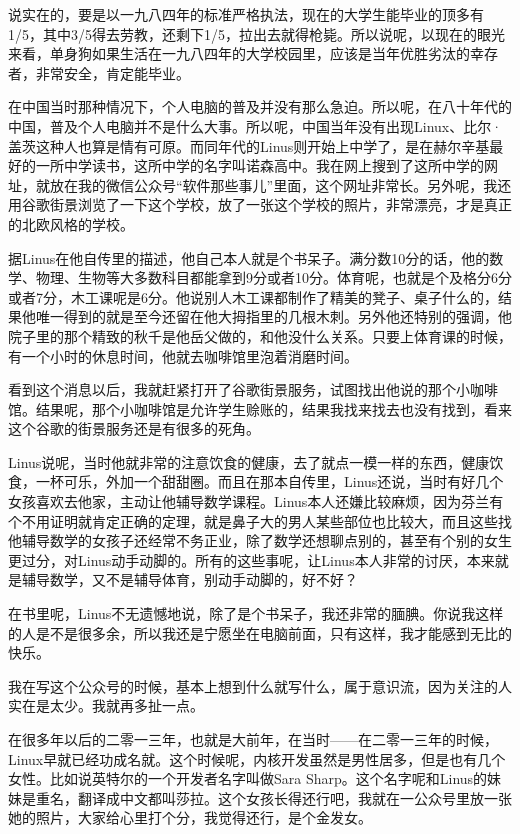 \documentclass[
  letterpaper,
  DIV=11,
  numbers=noendperiod]{scrreprt}
\begin{document}
说实在的，要是以一九八四年的标准严格执法，现在的大学生能毕业的顶多有1/5，其中3/5得去劳教，还剩下1/5，拉出去就得枪毙。所以说呢，以现在的眼光来看，单身狗如果生活在一九八四年的大学校园里，应该是当年优胜劣汰的幸存者，非常安全，肯定能毕业。

在中国当时那种情况下，个人电脑的普及并没有那么急迫。所以呢，在八十年代的中国，普及个人电脑并不是什么大事。所以呢，中国当年没有出现Linux、比尔·盖茨这种人也算是情有可原。而同年代的Linus则开始上中学了，是在赫尔辛基最好的一所中学读书，这所中学的名字叫诺森高中。我在网上搜到了这所中学的网址，就放在我的微信公众号``软件那些事儿''里面，这个网址非常长。另外呢，我还用谷歌街景浏览了一下这个学校，放了一张这个学校的照片，非常漂亮，才是真正的北欧风格的学校。

据Linus在他自传里的描述，他自己本人就是个书呆子。满分数10分的话，他的数学、物理、生物等大多数科目都能拿到9分或者10分。体育呢，也就是个及格分6分或者7分，木工课呢是6分。他说别人木工课都制作了精美的凳子、桌子什么的，结果他唯一得到的就是至今还留在他大拇指里的几根木刺。另外他还特别的强调，他院子里的那个精致的秋千是他岳父做的，和他没什么关系。只要上体育课的时候，有一个小时的休息时间，他就去咖啡馆里泡着消磨时间。

看到这个消息以后，我就赶紧打开了谷歌街景服务，试图找出他说的那个小咖啡馆。结果呢，那个小咖啡馆是允许学生赊账的，结果我找来找去也没有找到，看来这个谷歌的街景服务还是有很多的死角。

Linus说呢，当时他就非常的注意饮食的健康，去了就点一模一样的东西，健康饮食，一杯可乐，外加一个甜甜圈。而且在那本自传里，Linus还说，当时有好几个女孩喜欢去他家，主动让他辅导数学课程。Linus本人还嫌比较麻烦，因为芬兰有个不用证明就肯定正确的定理，就是鼻子大的男人某些部位也比较大，而且这些找他辅导数学的女孩子还经常不务正业，除了数学还想聊点别的，甚至有个别的女生更过分，对Linus动手动脚的。所有的这些事呢，让Linus本人非常的讨厌，本来就是辅导数学，又不是辅导体育，别动手动脚的，好不好？

在书里呢，Linus不无遗憾地说，除了是个书呆子，我还非常的腼腆。你说我这样的人是不是很多余，所以我还是宁愿坐在电脑前面，只有这样，我才能感到无比的快乐。

我在写这个公众号的时候，基本上想到什么就写什么，属于意识流，因为关注的人实在是太少。我就再多扯一点。

在很多年以后的二零一三年，也就是大前年，在当时------在二零一三年的时候，Linux早就已经功成名就。这个时候呢，内核开发虽然是男性居多，但是也有几个女性。比如说英特尔的一个开发者名字叫做Sara
Sharp。这个名字呢和Linus的妹妹是重名，翻译成中文都叫莎拉。这个女孩长得还行吧，我就在一公众号里放一张她的照片，大家给心里打个分，我觉得还行，是个金发女。
\end{document}

